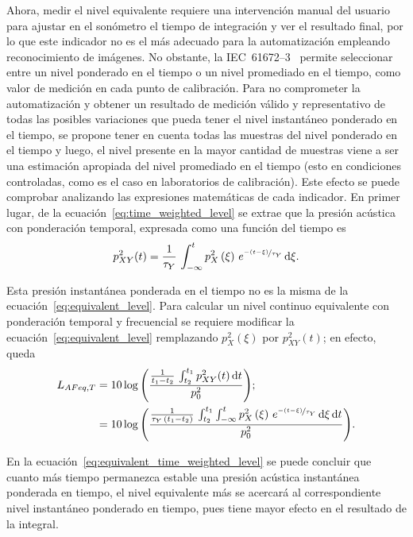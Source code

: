 Ahora, medir el nivel equivalente requiere una intervención manual del usuario para ajustar en el sonómetro el tiempo de integración y ver el resultado final, por lo que este indicador no es el más adecuado para la automatización empleando reconocimiento de imágenes.
No obstante, la \mbox{IEC 61672--3}~\citeyearpar{IEC_TC29_2013_3} permite seleccionar entre un nivel ponderado en el tiempo o un nivel promediado en el tiempo, como valor de medición en cada punto de calibración.
Para no comprometer la automatización y obtener un resultado de medición válido y representativo de todas las posibles variaciones que pueda tener el nivel instantáneo ponderado en el tiempo, se propone tener en cuenta todas las muestras del nivel ponderado en el tiempo y luego, el nivel presente en la mayor cantidad de muestras viene a ser una estimación apropiada del nivel promediado en el tiempo (esto en condiciones controladas, como es el caso en laboratorios de calibración).
Este efecto se puede comprobar analizando las expresiones matemáticas de cada indicador.
En primer lugar, de la ecuación~\eqref{eq:time_weighted_level} se extrae que la presión acústica con ponderación temporal, expresada como una función del tiempo es
%
\begin{equation}
    p_{XY}^2(t) = \frac{1}{\tau_{Y}}\,\int_{-\infty}^t p_X^2\left(\xi\right)\,
    e^{\nicefrac{-\left(t - \xi\right)}{\tau_Y}}\,\mathrm{d}\xi.
\end{equation}

Esta presión instantánea ponderada en el tiempo no es la misma de la ecuación~\eqref{eq:equivalent_level}.
Para calcular un nivel continuo equivalente con ponderación temporal y frecuencial se requiere modificar la ecuación~\eqref{eq:equivalent_level} remplazando $p_X^2(\xi)$ por $p_{XY}^2(t)$; en efecto, queda
%
\begin{align}
    L_{AFeq,T} &= 10\log{\left(\frac{\frac{1}{t_1 - t_2}\,\int_{t_2}^{t_1} p_{XY}^2(t)\,\mathrm{d}t}{p_0^2}\right)}; \nonumber \\
    &= 10\log{\left(\frac{\frac{1}{\tau_Y\,\left(t_1 - t_2\right)}\,
    \int_{t_2}^{t_1} \int_{-\infty}^t p_X^2\left(\xi\right)\,
    e^{\nicefrac{-\left(t - \xi\right)}{\tau_Y}}\,\mathrm{d}\xi\,\mathrm{d}t}{p_0^2}\right)}. \label{eq:equivalent_time_weighted_level}
\end{align}

En la ecuación~\eqref{eq:equivalent_time_weighted_level} se puede concluir que cuanto más tiempo permanezca estable una presión acústica instantánea ponderada en tiempo, el nivel equivalente más se acercará al correspondiente nivel instantáneo ponderado en tiempo, pues tiene mayor efecto en el resultado de la integral.


